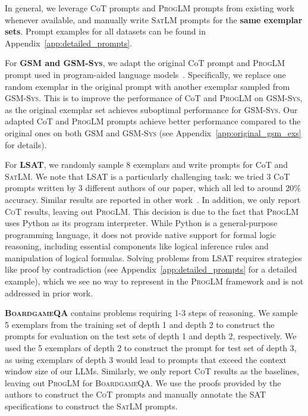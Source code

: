\documentclass{article}
\theoremstyle{definition}
\newcommand{\gsm}{\textsc{GSM}}
\newcommand{\gsmsys}{\textsc{GSM-Sys}}
\newcommand{\lsat}{\textsc{LSAT}}
\newcommand{\stregex}{\textsc{StRegex}}
\newcommand{\boardgame}{\textsc{BoardgameQA}}
\newcommand{\cotlm}{\textsc{CoT}}
\newcommand{\satlm}{\textsc{SatLM}}
\newcommand{\pallm}{\textsc{ProgLM}}
\begin{document}
In general, we leverage {\sc CoT} prompts and \pallm{} prompts from existing work whenever available, and manually write \satlm{} prompts for the \textbf{same exemplar sets}. Prompt examples for all datasets can be found in Appendix~\ref{app:detailed_prompts}.


For \textbf{\gsm{} and \gsmsys{}}, we adapt the original {\sc CoT} prompt and \pallm{} prompt used in program-aided language models~\citep{pal}. Specifically, we replace one random exemplar in the original prompt with another exemplar sampled from \gsmsys{}. This is to improve the performance of {\sc CoT} and \pallm{} on \gsmsys{}, as the original exemplar set achieves suboptimal performance for \gsmsys{}. Our adapted {\sc CoT} and \pallm{} prompts achieve better performance compared to the original ones on both \gsm{}
 and \gsmsys{} (see Appendix~\ref{app:original_gsm_exs} for details).


 For \textbf{\lsat{}}, we randomly sample 8 exemplars and write prompts for {\sc CoT} and \satlm{}. We note that \lsat{} is a particularly challenging task: we tried 3 CoT prompts written by 3 different authors of our paper, which all led to around 20\% accuracy. Similar results are reported in other work~\citep{Liang2022HolisticEO,ribeiro2023street}. In addition, we only report \cotlm{} results, leaving out \pallm{}. This decision is due to the fact that \pallm{} uses Python as its program interpreter. While Python is a general-purpose programming language, it does not provide native support for formal logic reasoning, including essential components like logical inference rules and manipulation of logical formulas. Solving problems from \lsat{} requires strategies like proof by contradiction (see Appendix~\ref{app:detailed_prompts} for a detailed example), which we see no way to represent in the \pallm{} framework and is not addressed in prior work. 

\textbf{\boardgame{}} contains problems requiring 1-3 steps of reasoning. We sample 5 exemplars from the training set of depth 1 and depth 2 to construct the prompts for evaluation on the test sets of depth 1 and depth 2, respectively. We used the 5 exemplars of depth 2 to construct the prompt for test set of depth 3, as using exemplars of depth 3 would lead to prompts that exceed the context window size of our LLMs. Similarly, we only report \cotlm{} results as the baselines, leaving out \pallm{} for \boardgame{}. We use the proofs provided by the authors to construct the \cotlm{} prompts and manually annotate the SAT specifications to construct the \satlm{} prompts.
\end{document}
